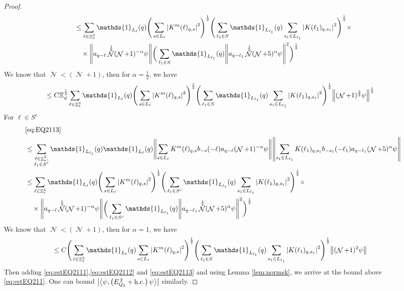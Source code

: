\documentclass[12pt,a4paper]{article}
\numberwithin{equation}{section}
\newcommand{\1}{\mathbb{I}}
\DeclareMathOperator{\Z}{\mathbb{Z}}
\DeclareMathOperator{\NN}{\mathcal{N}}
\newcommand{\half}{\frac{1}{2}}
\newcommand{\eva}[1]{\left\langle #1 \right\rangle}
\theoremstyle{plain}
\theoremstyle{definition}
\theoremstyle{remark}
\theoremstyle{plain}
\theoremstyle{definition}
\theoremstyle{remark}
\begin{document}
\begin{proof}
\begin{align}
		&\leq\sum\limits_{\ell\in \Z^3_*}  \mathds{1}_{L_{\ell}}(q) \Bigg(\sum\limits_{s \in L_{\ell}} \abs{K^m(\ell)_{q,s}}^2\Bigg)^\half \Bigg(\sum\limits_{ \ell_1\in S} \mathds{1}_{L_{\ell_1}}(q)\sum\limits_{s_1 \in L_{\ell_1}} \abs{K(\ell_1)_{q,s_1}}^2\Bigg)^\half \times \\ &\quad\times \norm{ a_{q-\ell} \NN^\half (\NN+1)^{-\alpha}\psi} \bigg(\sum\limits_{ \ell_1\in S} \mathds{1}_{L_{\ell_1}}(q) \norm{ a_{q-\ell_1} \NN^\half (\NN+5)^{\alpha} \psi }^2\bigg)^\half\nonumber\\
	\end{align}
	We know that $\NN<(\NN+1)$, then for $\alpha = \half$, we have
	\begin{align}
		&\leq C \Xi_{\psi}^\half \sum\limits_{\ell\in \Z^3_*}  \mathds{1}_{L_{\ell}}(q) \Bigg(\sum\limits_{s \in L_{\ell}} \abs{K^m(\ell)_{q,s}}^2\Bigg)^\half \Bigg(\sum\limits_{ \ell_1\in S} \mathds{1}_{L_{\ell_1}}(q)\sum\limits_{s_1 \in L_{\ell_1}} \abs{K(\ell_1)_{q,s_1}}^2\Bigg)^\half\norm{ (\NN+1)^{\frac{3}{2}}\psi}^\half  \label{eq:estEQ2113}
	\end{align}
	For $\ell \in S^c$
	\begin{align}
		&\eqref{eq:EQ2113}\nonumber\\
		&\leq\sum\limits_{\substack{\ell\in \Z^3_*,\\ \ell_1\in S^c}} \mathds{1}_{L_{\ell_1}}(q) \mathds{1}_{L_{\ell}}(q)  \norm{ \sum\limits_{s\in L_{\ell}} K^m(\ell)_{q,s} b_{-s}(-\ell) a_{q-\ell}(\NN+1)^{-\alpha}\psi}\norm{ \sum\limits_{s_1 \in L_{\ell_1}} K(\ell_1)_{q,s_1} b_{-s_1}(-\ell_1)a_{q-\ell_1} (\NN+5)^{\alpha} \psi }\nonumber\\
		&\leq\sum\limits_{\ell\in \Z^3_*}  \mathds{1}_{L_{\ell}}(q) \Bigg(\sum\limits_{s \in L_{\ell}} \abs{K^m(\ell)_{q,s}}^2\Bigg)^\half \Bigg(\sum\limits_{ \ell_1\in S^c} \mathds{1}_{L_{\ell_1}}(q)\sum\limits_{s_1 \in L_{\ell_1}} \abs{K(\ell_1)_{q,s_1}}^2\Bigg)^\half \times \\ &\quad\times \norm{ a_{q-\ell} \NN^\half (\NN+1)^{-\alpha}\psi} \bigg(\sum\limits_{ \ell_1\in S^c} \mathds{1}_{L_{\ell_1}}(q) \norm{ a_{q-\ell_1} \NN^\half (\NN+5)^{\alpha} \psi }^2\bigg)^\half\nonumber\\
	\end{align}
	We know that $\NN<(\NN+1)$, then for $\alpha = 1$, we have
	\begin{align}
		&\leq  C\Bigg(\sum\limits_{\ell\in \Z^3_*}  \mathds{1}_{L_{\ell}}(q) \sum\limits_{s \in L_{\ell}} \abs{K^m(\ell)_{q,s}}^2\Bigg)^\half \Bigg(\sum\limits_{ \ell_1\in S} \mathds{1}_{L_{\ell_1}}(q)\sum\limits_{s_1 \in L_{\ell_1}} \abs{K(\ell_1)_{q,s_1}}^2\Bigg)^\half\norm{ (\NN+1)^2\psi}  \label{eq:estEQ2113c}
	\end{align}
	Then adding \eqref{eq:estEQ2111},\eqref{eq:estEQ2112} and \eqref{eq:estEQ2113} and using Lemma \ref{lem:normsk}, we arrive at the bound above \eqref{eq:estEQ211}. One can bound $\abs{\eva{\psi,\left(E^{\,2}_{Q_2}+\mathrm{h.c.}\right) \psi }}$ similarly.
\end{proof}
\end{document}
